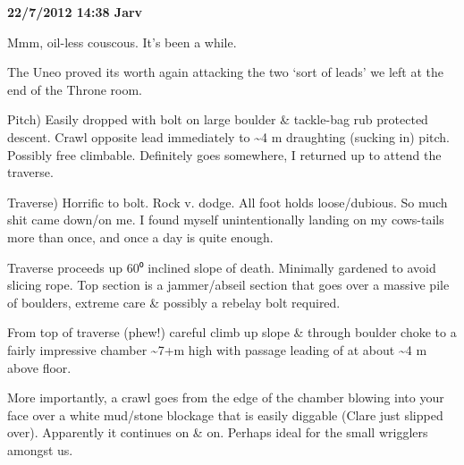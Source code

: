 \textbf{22/7/2012 14:38 Jarv}

Mmm, oil-less couscous. It's been a while.

The Uneo proved its worth again attacking the two `sort of leads' we
left at the end of the Throne room.

Pitch) Easily dropped with bolt on large boulder \& tackle-bag rub
protected descent. Crawl opposite lead immediately to \textasciitilde 4
m draughting (sucking in) pitch. Possibly free climbable. Definitely
goes somewhere, I returned up to attend the traverse.

Traverse) Horrific to bolt. Rock v. dodge. All foot holds loose/dubious.
So much shit came down/on me. I found myself unintentionally landing on
my cows-tails more than once, and once a day is quite enough.

Traverse proceeds up 60⁰ inclined slope of death. Minimally gardened to
avoid slicing rope. Top section is a jammer/abseil section that goes
over a massive pile of boulders, extreme care \& possibly a rebelay bolt
required.

From top of traverse (phew!) careful climb up slope \& through boulder
choke to a fairly impressive chamber \textasciitilde 7+m high with
passage leading of at about \textasciitilde 4 m above floor.

More importantly, a crawl goes from the edge of the chamber blowing into
your face over a white mud/stone blockage that is easily diggable (Clare
just slipped over). Apparently it continues on \& on. Perhaps ideal for
the small wrigglers amongst us.

